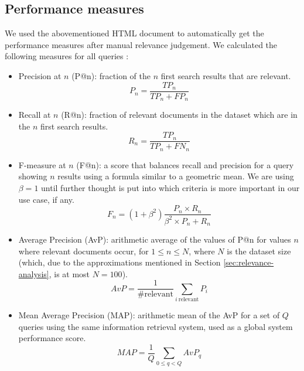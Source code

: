 \documentclass[sigconf, authorversion]{acmart}
\begin{document}
\subsection{Performance measures}

We used the abovementioned HTML document to automatically get the performance measures after manual relevance judgement. We calculated the following measures for all queries \cite{search-engines-2015}:

\begin{itemize}
    \item Precision at $n$ (P@n): fraction of the $n$ first search results that are relevant.
    \begin{equation}
        P_n = \frac{TP_n}{TP_n + FP_n}
    \end{equation}
    \item Recall at $n$ (R@n): fraction of relevant documents in the dataset which are in the $n$ first search results.
    \begin{equation}
        R_n = \frac{TP_n}{TP_n + FN_n}
    \end{equation}
    \item F-measure at $n$ (F@n): a score that balances recall and precision for a query showing $n$ results using a formula similar to a geometric mean. We are using $\beta=1$ until further thought is put into which criteria is more important in our use case, if any.
    \begin{equation}
        F_n = (1 + \beta^2)\frac{P_n \times R_n}{\beta^2 \times P_n + R_n}
    \end{equation}
    \item Average Precision (AvP): arithmetic average of the values of P@n for values $n$ where relevant documents occur, for $1 \leq n \leq N$, where $N$ is the dataset size (which, due to the approximations mentioned in Section \ref{sec:relevance-analysis}, is at most $N=100$).
    \begin{equation}
        AvP = \frac{1}{\text{\#relevant}} \sum_{i~\text{relevant}}{P_i}
    \end{equation}
    \item Mean Average Precision (MAP): arithmetic mean of the AvP for a set of $Q$ queries using the same information retrieval system, used as a global system performance score.
    \begin{equation}
        MAP = \frac{1}{Q} \sum_{0 \leq q < Q}{AvP_q}
    \end{equation}
\end{itemize}
\end{document}

